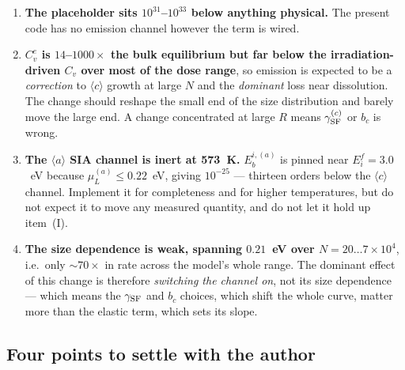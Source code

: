 \documentclass[11pt]{article}
\newcommand{\aloop}{\ensuremath{\langle a\rangle}}
\newcommand{\cloop}{\ensuremath{\langle c\rangle}}
\newcommand{\GSF}{\gamma_{\rm SF}}
\begin{document}
\begin{enumerate}
\item \textbf{The placeholder sits $10^{31}$--$10^{33}$ below anything
  physical.}  The present code has no emission channel however the term is
  wired.
\item \textbf{$C_v^{e}$ is $14$--$1000\times$ the bulk equilibrium but far
  below the irradiation-driven $C_v$ over most of the dose range}, so
  emission is expected to be a \emph{correction} to \cloop{} growth at large
  $N$ and the \emph{dominant} loss near dissolution.  The change should
  reshape the small end of the size distribution and barely move the large
  end.  A change concentrated at large $R$ means $\GSF^{(c)}$ or $b_c$ is
  wrong.
\item \textbf{The \aloop{} SIA channel is inert at 573~K.}  $E_b^{i,(a)}$ is
  pinned near $E_i^{f}=3.0$~eV because $\mu_L^{(a)}\le0.22$~eV, giving
  $10^{-25}$ --- thirteen orders below the \cloop{} channel.  Implement it for
  completeness and for higher temperatures, but do not expect it to move any
  measured quantity, and do not let it hold up item~(I).
\item \textbf{The size dependence is weak, spanning $0.21$~eV over
  $N=20\ldots7\times10^{4}$}, i.e.\ only $\sim70\times$ in rate across the
  model's whole range.  The dominant effect of this change is therefore
  \emph{switching the channel on}, not its size dependence --- which means the
  $\GSF$ and $b_c$ choices, which shift the whole curve, matter more than the
  elastic term, which sets its slope.
\end{enumerate}

\subsection{Four points to settle with the author}
\label{sec:queries}
\end{document}

